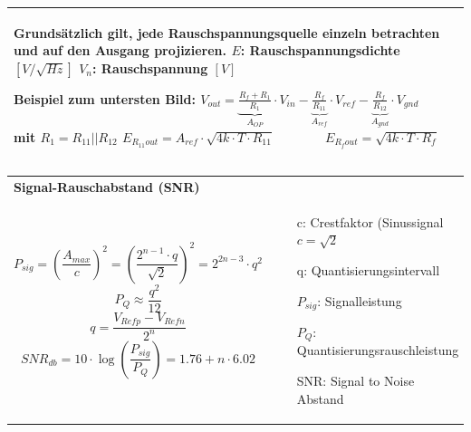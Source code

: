 \begin{longtable}[t]{|p{4cm}|p{13.8cm}|}
{    Grundsätzlich gilt, jede Rauschspannungsquelle einzeln betrachten und auf den Ausgang projizieren. 
    \newline
    \newline
    $E$: Rauschspannungsdichte $[V/\sqrt{Hz}]$ \newline
    $V_n$: Rauschspannung $[V]$ \newline
    
    \textbf{Beispiel zum untersten Bild:} \newline
    $V_{out} = \underbrace{\frac{R_f + R_1}{R_1}}_{A_{OP}} \cdot V_{in} - \underbrace{\frac{R_f}{R_{11}}}_{A_{ref}}
    \cdot V_{ref} - \underbrace{\frac{R_f}{R_{12}}}_{A_{gnd}} \cdot V_{gnd}$ \qquad mit $R_1 = R_{11} || R_{12}$ \newline
    $E_{R_{11}out} = A_{ref} \cdot \sqrt{4k \cdot T \cdot R_{11}} \qquad  \qquad E_{R_fout} = \sqrt{4k \cdot T \cdot R_f}$
    }
    \\ \hline
\end{longtable}    
    
\newpage


\vspace{-2.5\topsep}
\begin{longtable}[t]{|p{9cm}|p{9cm}|}
  \hline  
    \multicolumn{2}{|l|}{\bf Signal-Rauschabstand (SNR)} \\
  \hdashline
    \vspace{-1.5\topsep}
    \[ P_{sig} = \left(\frac{A_{max}}{c}\right)^2=\left(\frac{2^{n-1}\cdot q}{\sqrt 2}\right)^2 = 2^{2n-3}\cdot q^2\]    
    \newline
    \[ P_Q \approx \frac{q^2}{12} \] \newline
    \[ q = \frac{V_{Refp}-V_{Refn}}{2^n} \]  \newline
    \[ SNR_{db} = 10 \cdot \log\left(\frac{P_{sig}}{P_Q}\right) = 1.76+n \cdot 6.02 \] &
    \vspace{-1.5\topsep}
    \begin{itemize}
      \item[c:] Crestfaktor (Sinussignal $c=\sqrt 2$
      \item[q:] Quantisierungsintervall
      \item[$P_{sig}$:] Signalleistung
      \item[$P_Q$:] Quantisierungsrauschleistung
      \item[SNR:] Signal to Noise Abstand
    \end{itemize} \\
  \hline
\end{longtable}
    
    
    